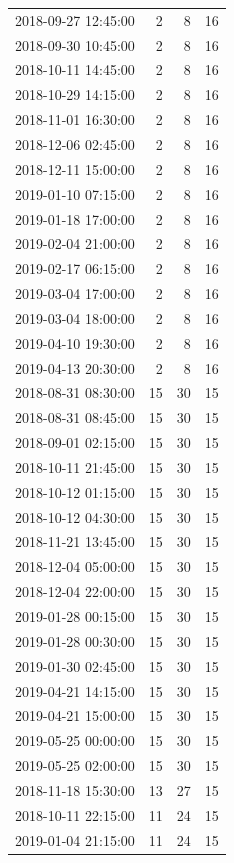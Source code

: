 \begin{tabular}{lrrr}
2018-09-27 12:45:00 & 2 & 8 & 16 \\
2018-09-30 10:45:00 & 2 & 8 & 16 \\
2018-10-11 14:45:00 & 2 & 8 & 16 \\
2018-10-29 14:15:00 & 2 & 8 & 16 \\
2018-11-01 16:30:00 & 2 & 8 & 16 \\
2018-12-06 02:45:00 & 2 & 8 & 16 \\
2018-12-11 15:00:00 & 2 & 8 & 16 \\
2019-01-10 07:15:00 & 2 & 8 & 16 \\
2019-01-18 17:00:00 & 2 & 8 & 16 \\
2019-02-04 21:00:00 & 2 & 8 & 16 \\
2019-02-17 06:15:00 & 2 & 8 & 16 \\
2019-03-04 17:00:00 & 2 & 8 & 16 \\
2019-03-04 18:00:00 & 2 & 8 & 16 \\
2019-04-10 19:30:00 & 2 & 8 & 16 \\
2019-04-13 20:30:00 & 2 & 8 & 16 \\
2018-08-31 08:30:00 & 15 & 30 & 15 \\
2018-08-31 08:45:00 & 15 & 30 & 15 \\
2018-09-01 02:15:00 & 15 & 30 & 15 \\
2018-10-11 21:45:00 & 15 & 30 & 15 \\
2018-10-12 01:15:00 & 15 & 30 & 15 \\
2018-10-12 04:30:00 & 15 & 30 & 15 \\
2018-11-21 13:45:00 & 15 & 30 & 15 \\
2018-12-04 05:00:00 & 15 & 30 & 15 \\
2018-12-04 22:00:00 & 15 & 30 & 15 \\
2019-01-28 00:15:00 & 15 & 30 & 15 \\
2019-01-28 00:30:00 & 15 & 30 & 15 \\
2019-01-30 02:45:00 & 15 & 30 & 15 \\
2019-04-21 14:15:00 & 15 & 30 & 15 \\
2019-04-21 15:00:00 & 15 & 30 & 15 \\
2019-05-25 00:00:00 & 15 & 30 & 15 \\
2019-05-25 02:00:00 & 15 & 30 & 15 \\
2018-11-18 15:30:00 & 13 & 27 & 15 \\
2018-10-11 22:15:00 & 11 & 24 & 15 \\
2019-01-04 21:15:00 & 11 & 24 & 15 \\

\end{tabular}
